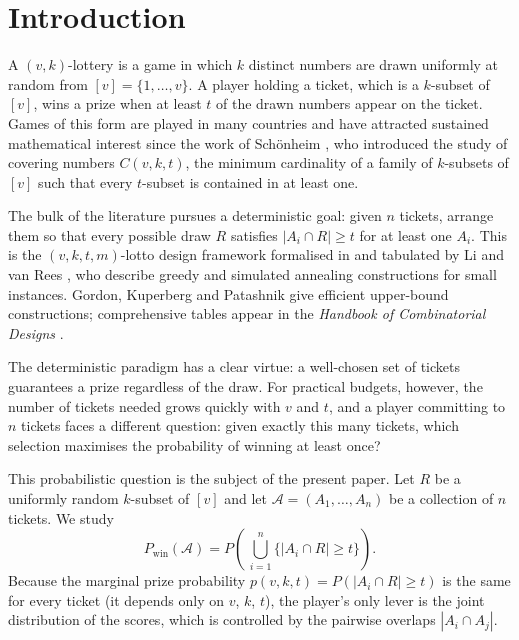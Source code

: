 
\section{Introduction}
\label{sec:intro}

A $(v,k)$-lottery is a game in which $k$ distinct numbers are drawn
uniformly at random from $[v] = \{1,\ldots,v\}$.  A player holding a ticket,
which is a $k$-subset of $[v]$, wins a prize when at least $t$ of the drawn
numbers appear on the ticket.  Games of this form are played in many countries
and have attracted sustained mathematical interest since the work of
Sch\"{o}nheim \cite{Schoenheim1964}, who introduced the study of covering
numbers $C(v,k,t)$, the minimum cardinality of a family of $k$-subsets
of $[v]$ such that every $t$-subset is contained in at least one.

The bulk of the literature pursues a deterministic goal: given $n$ tickets,
arrange them so that every possible draw $R$ satisfies $|A_i \cap R| \ge t$
for at least one $A_i$.  This is the $(v,k,t,m)$-lotto design framework
formalised in \cite{Furedi1996} and tabulated by Li and van Rees \cite{Li2002},
who describe greedy and simulated annealing constructions for small instances.
Gordon, Kuperberg and Patashnik \cite{Gordon1995} give efficient upper-bound
constructions; comprehensive tables appear in the \emph{Handbook of
Combinatorial Designs} \cite{Colbourn2007}.

The deterministic paradigm has a clear virtue: a well-chosen set of tickets
guarantees a prize regardless of the draw.  For practical budgets, however,
the number of tickets needed grows quickly with $v$ and $t$, and a player
committing to $n$ tickets faces a different question: given exactly this many
tickets, which selection maximises the probability of winning at least once?

This probabilistic question is the subject of the present paper.  Let $R$ be
a uniformly random $k$-subset of $[v]$ and let $\mathcal{A} = (A_1,\ldots,A_n)$
be a collection of $n$ tickets.  We study
\begin{equation}
  \label{eq:objective}
  P_{\mathrm{win}}(\mathcal{A})
  = P\!\left(\,\bigcup_{i=1}^{n} \{|A_i \cap R| \ge t\}\right).
\end{equation}
Because the marginal prize probability $p(v,k,t) = P(|A_i \cap R| \ge t)$ is
the same for every ticket (it depends only on $v$, $k$, $t$), the player's
only lever is the joint distribution of the scores, which is controlled by
the pairwise overlaps $|A_i \cap A_j|$.

